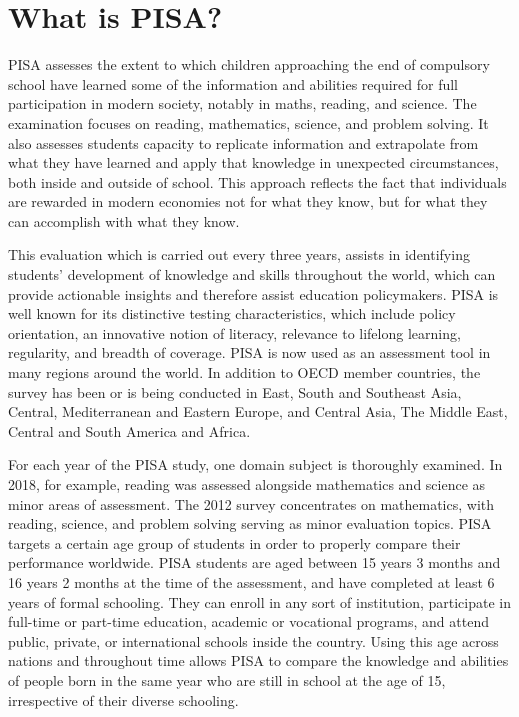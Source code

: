 \hypertarget{what-is-pisa}{%
\section{What is PISA?}\label{what-is-pisa}}

PISA assesses the extent to which children approaching the end of
compulsory school have learned some of the information and abilities
required for full participation in modern society, notably in maths,
reading, and science. The examination focuses on reading, mathematics,
science, and problem solving. It also assesses students capacity to
replicate information and extrapolate from what they have learned and
apply that knowledge in unexpected circumstances, both inside and
outside of school. This approach reflects the fact that individuals are
rewarded in modern economies not for what they know, but for what they
can accomplish with what they know.

This evaluation which is carried out every three years, assists in
identifying students' development of knowledge and skills throughout the
world, which can provide actionable insights and therefore assist
education policymakers. PISA is well known for its distinctive testing
characteristics, which include policy orientation, an innovative notion
of literacy, relevance to lifelong learning, regularity, and breadth of
coverage. PISA is now used as an assessment tool in many regions around
the world. In addition to OECD member countries, the survey has been or
is being conducted in East, South and Southeast Asia, Central,
Mediterranean and Eastern Europe, and Central Asia, The Middle East,
Central and South America and Africa. \citep{pisabook}

For each year of the PISA study, one domain subject is thoroughly
examined. In 2018, for example, reading was assessed alongside
mathematics and science as minor areas of assessment. The 2012 survey
concentrates on mathematics, with reading, science, and problem solving
serving as minor evaluation topics. PISA targets a certain age group of
students in order to properly compare their performance worldwide. PISA
students are aged between 15 years 3 months and 16 years 2 months at the
time of the assessment, and have completed at least 6 years of formal
schooling. They can enroll in any sort of institution, participate in
full-time or part-time education, academic or vocational programs, and
attend public, private, or international schools inside the country.
Using this age across nations and throughout time allows PISA to compare
the knowledge and abilities of people born in the same year who are
still in school at the age of 15, irrespective of their diverse
schooling. \citep{pisabook}

